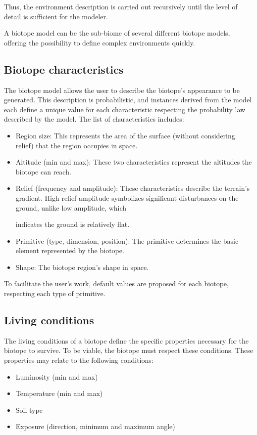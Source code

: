 Thus, the environment description is carried out recursively until the level of detail is sufficient for the modeler.

A biotope model can be the sub-biome of several different biotope models, offering the possibility to define complex environments quickly.

\subsection{Biotope characteristics}
The biotope model allows the user to describe the biotope's appearance to be generated. This description is probabilistic, and instances derived from the model each define a unique value for each characteristic respecting the probability law described by the model. The list of characteristics includes:
\begin{itemize}
	\item Region size: This represents the area of the surface (without considering relief) that the region occupies in space.
	\item Altitude (min and max): These two characteristics represent the altitudes the biotope can reach.
	\item Relief (frequency and amplitude): These characteristics describe the terrain's gradient. High relief amplitude symbolizes significant disturbances on the ground, unlike low amplitude, which
	
	indicates the ground is relatively flat.
	\item Primitive (type, dimension, position): The primitive determines the basic element represented by the biotope.
	\item Shape: The biotope region's shape in space.
\end{itemize}

To facilitate the user's work, default values are proposed for each biotope, respecting each type of primitive.

\subsection{Living conditions}
The living conditions of a biotope define the specific properties necessary for the biotope to survive. To be viable, the biotope must respect these conditions. These properties may relate to the following conditions:
\begin{itemize}
	\item Luminosity (min and max)
	\item Temperature (min and max)
	\item Soil type
	\item Exposure (direction, minimum and maximum angle)
\end{itemize}

